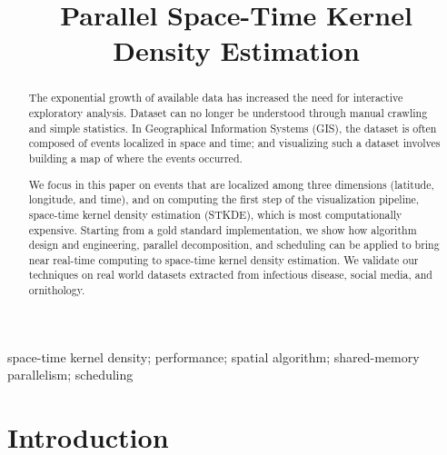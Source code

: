 \documentclass[10pt, conference, compsocconf]{IEEEtran}
\begin{document}
\title{Parallel Space-Time Kernel Density Estimation}


\author{
}

\maketitle


\begin{abstract}
  The exponential growth of available data has
  increased the need for interactive exploratory analysis. Dataset
  can no longer be understood through  manual crawling  and
 simple statistics. In Geographical Information Systems
  (GIS), the dataset is often composed of events localized in space
  and time; and visualizing such a dataset involves building a map of
  where the events occurred.

  We focus in this paper on events that are localized among three
  dimensions (latitude, longitude, and time), and on computing the
  first step of the visualization pipeline, space-time kernel density
  estimation (STKDE), which is most computationally expensive.  Starting from
  a gold standard implementation, we show how algorithm design and
  engineering, parallel decomposition, and scheduling can be applied
  to bring near real-time computing to space-time kernel density
  estimation. We validate our techniques on real world datasets
  extracted from infectious disease, social media, and ornithology.
\end{abstract}

\begin{IEEEkeywords}
space-time kernel density; performance; spatial algorithm; shared-memory parallelism; scheduling
\end{IEEEkeywords}


\IEEEpeerreviewmaketitle

\section{Introduction}
\end{document}
